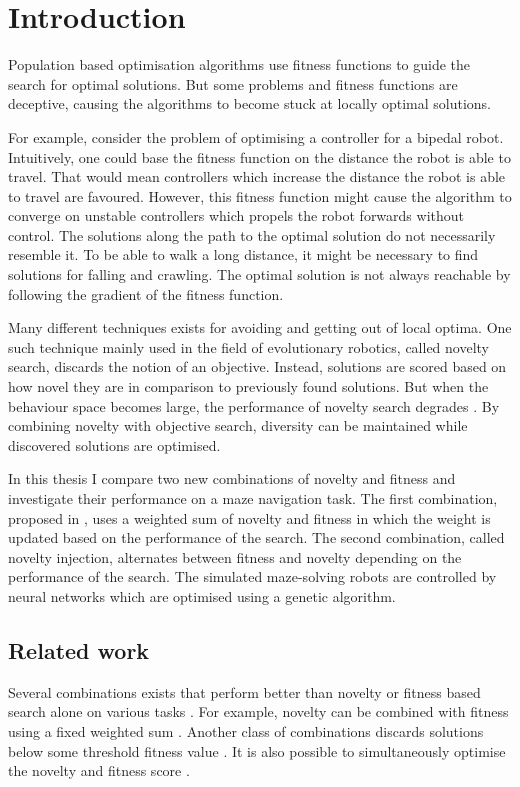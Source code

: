 \section{Introduction}

\label{sec:intro}

Population based optimisation algorithms use fitness functions to guide the search for optimal solutions.
But some problems and fitness functions are deceptive, causing the algorithms to become stuck at
locally optimal solutions.

For example, consider the problem of optimising a controller for a bipedal
robot. Intuitively, one could base the fitness function on the distance the robot is able to travel.
That would mean controllers which increase the distance the robot is able to travel are favoured.
However, this fitness function might cause the algorithm to converge on unstable controllers which
propels the robot forwards without control. The solutions along the path to the optimal solution
do not necessarily resemble it. To be able to walk a long distance, it might be necessary to find
solutions for falling and crawling. The optimal solution is not always reachable by following
the gradient of the fitness function.

Many different techniques exists for avoiding and getting out of local optima. One such technique
mainly used in the field of evolutionary robotics, called
novelty search, discards the notion of an objective. Instead, solutions are scored based on how novel
they are in comparison to previously found solutions. But when the behaviour space becomes large, the performance
of novelty search degrades \cite{novelty_not_enough}. By combining novelty with objective search, diversity
can be maintained while discovered solutions are optimised.

In this thesis I compare two new combinations of novelty and fitness and investigate their performance
on a maze navigation task. The first combination, proposed in \cite{novelty_not_enough}, uses a weighted
sum of novelty and fitness in which the weight is updated based on the performance of the search.
The second combination, called novelty injection, alternates between fitness and novelty depending
on the performance of the search.
The simulated maze-solving robots are controlled by neural networks which are optimised using a genetic algorithm.

\subsection{Related work}
Several combinations exists that perform better than novelty or fitness based search alone
on various tasks \cite{ns_study}. For example, novelty can be combined with fitness using a
fixed weighted sum \cite{novelty_not_enough}. Another class of combinations discards solutions below
some threshold fitness value \cite{minimal_ns}. It is also possible to simultaneously optimise
the novelty and fitness score \cite{multi_ns}.
